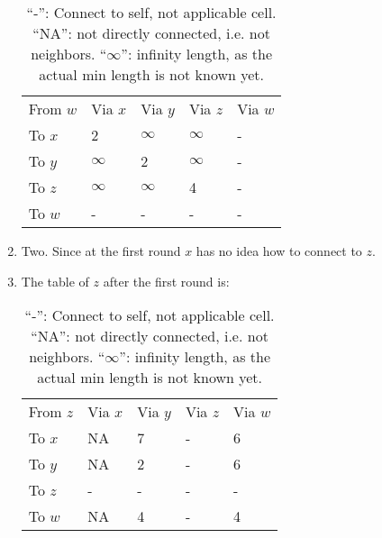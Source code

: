 \begin{enumerate}
\begin{table}[H]
                  \vspace{5mm}

                  \begin{tabular}{lllll}
                        From $w$ & Via $x$  & Via $y$  & Via $z$  & Via $w$ \\
                        To $x$   & 2        & $\infty$ & $\infty$ & -       \\
                        To $y$   & $\infty$ & 2        & $\infty$ & -       \\
                        To $z$   & $\infty$ & $\infty$ & 4        & -       \\
                        To $w$   & -        & -        & -        & -
                  \end{tabular}


                  \caption{
                        ``-'': Connect to self, not applicable cell.
                        ``NA'': not directly connected, i.e. not neighbors.
                        ``$\infty$'': infinity length, as the actual min length is not known yet.
                  }
            \end{table}

      \item Two. Since at the first round $x$ has no idea how to connect to $z$.
      \item The table of $z$ after the first round is:
            \begin{table}
                  \centering
                  \begin{tabular}{lllll}
                        From $z$ & Via $x$ & Via $y$ & Via $z$ & Via $w$ \\
                        To $x$   & NA      & 7       & -       & 6       \\
                        To $y$   & NA      & 2       & -       & 6       \\
                        To $z$   & -       & -       & -       & -       \\
                        To $w$   & NA      & 4       & -       & 4
                  \end{tabular}
                  \caption{
                        ``-'': Connect to self, not applicable cell.
                        ``NA'': not directly connected, i.e. not neighbors.
                        ``$\infty$'': infinity length, as the actual min length is not known yet.
                  }
            \end{table}

\end{enumerate}

